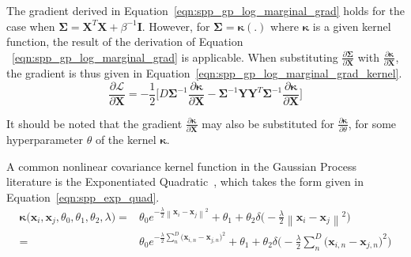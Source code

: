 The gradient derived in Equation~\ref{eqn:spp_gp_log_marginal_grad} holds 
for the case when \( \bm{\Sigma} = \bm{X}^{T}\bm{X} + \beta^{-1} \bm{I} \). 
However, for \( \bm{\Sigma} = \bm{\kappa}(.) \) where \( \bm{\kappa} \) is 
a given kernel function, the result of the derivation of Equation
~\ref{eqn:spp_gp_log_marginal_grad} is applicable. When substituting 
\( \frac{\partial \bm{\Sigma}}{\partial \bm{X}} \) with 
\( \frac{\partial \bm{\kappa}}{\partial \bm{X}} \), the gradient is thus 
given in Equation~\ref{eqn:spp_gp_log_marginal_grad_kernel}.
\begin{equation}
  \label{eqn:spp_gp_log_marginal_grad_kernel}
  \frac{\partial \mathcal{L}}{\partial \bm{X}} = 
  -\frac{1}{2} \Bigg[
    D \bm{\Sigma}^{-1} \frac{\partial \bm{\kappa}}{\partial \bm{X}}
    - \bm{\Sigma}^{-1} \bm{YY}^{T} \bm{\Sigma}^{-1} 
    \frac{\partial \bm{\kappa}}{\partial \bm{X}}
  \Bigg]
\end{equation}

It should be noted that the gradient \( \frac{\partial \bm{\kappa}}{\partial \bm{X}} \)
may also be substituted for \( \frac{\partial \bm{\kappa}}{\partial \theta} \), for 
some hyperparameter \( \theta \) of the kernel \( \bm{\kappa} \).

A common nonlinear covariance kernel function in the Gaussian Process literature 
is the Exponentiated Quadratic~\cite{Lawrence2005}, which takes the form given in 
Equation~\ref{eqn:spp_exp_quad}.
\begin{align}
  \label{eqn:spp_exp_quad}
  \bm{\kappa} \big( \bm{x}_{i}, \bm{x}_{j}, \theta_{0}, 
  \theta_{1}, \theta_{2}, \lambda \big) ={}&
  \theta_{0} e^{-\frac{\lambda}{2} 
  \left\lVert \bm{x}_{i} - \bm{x}_{j} \right\rVert^{2}}
  + \theta_{1} + \theta_{2} \delta \big( -\frac{\lambda}{2} 
  \left\lVert \bm{x}_{i} - \bm{x}_{j} \right\rVert^{2} \big)\\
  ={}& \theta_{0} e^{-\frac{\lambda}{2} 
  \sum_{n}^{D} {\big( \bm{x}_{i, n} - \bm{x}_{j, n} \big)}^{2}}
  + \theta_{1} + \theta_{2} \delta \big( -\frac{\lambda}{2} 
  \sum_{n}^{D} {\big( \bm{x}_{i, n} - \bm{x}_{j, n} \big)}^{2} \big)
\end{align}

